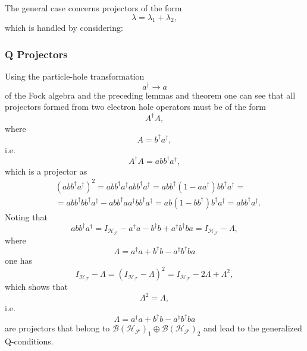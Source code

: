 \documentclass[aps,preprint,amsfonts,amssymb,showpacs,showkeys]{revtex4}%
\begin{document}
The general case concerns projectors of the form
\begin{equation}
\lambda=\lambda_{1}+\lambda_{2},
\end{equation}
which is handled by considering:

\subsubsection{Q Projectors}

Using the particle-hole transformation
\begin{equation}
a^{\dagger}\rightarrow a
\end{equation}
of the Fock algebra and the preceding lemmas and theorem one can see that all
projectors formed from two electron hole operators must be of the form%
\begin{equation}
A^{\dagger}A,
\end{equation}
where
\begin{equation}
A=b^{\dagger}a^{\dagger},
\end{equation}
i.e.%
\begin{equation}
A^{\dagger}A=abb^{\dagger}a^{\dagger},
\end{equation}
which is a projector as
\begin{align}
&  \left(  abb^{\dagger}a^{\dagger}\right)  ^{2}=abb^{\dagger}a^{\dagger
}abb^{\dagger}a^{\dagger}=abb^{\dagger}\left(  1-aa^{\dagger}\right)
bb^{\dagger}a^{\dagger}=\nonumber\\
&  =abb^{\dagger}bb^{\dagger}a^{\dagger}-abb^{\dagger}aa^{\dagger}bb^{\dagger
}a^{\dagger}=ab\left(  1-bb^{\dagger}\right)  b^{\dagger}a^{\dagger
}=abb^{\dagger}a^{\dagger}.
\end{align}
Noting that
\begin{equation}
abb^{\dagger}a^{\dagger}=I_{\mathcal{H}_{\mathcal{F}}}-a^{\dagger}%
a-b^{\dagger}b+a^{\dagger}b^{\dagger}ba=I_{\mathcal{H}_{\mathcal{F}}}-\Lambda,
\end{equation}
where
\begin{equation}
\Lambda=a^{\dagger}a+b^{\dagger}b-a^{\dagger}b^{\dagger}ba
\end{equation}
one has
\begin{equation}
I_{\mathcal{H}_{\mathcal{F}}}-\Lambda=\left(  I_{\mathcal{H}_{\mathcal{F}}%
}-\Lambda\right)  ^{2}=I_{\mathcal{H}_{\mathcal{F}}}-2\Lambda+\Lambda^{2},
\end{equation}
which shows that
\begin{equation}
\Lambda^{2}=\Lambda,
\end{equation}
i.e.
\begin{equation}
\Lambda=a^{\dagger}a+b^{\dagger}b-a^{\dagger}b^{\dagger}ba
\end{equation}
are projectors that belong to $\mathcal{B}\left(  \mathcal{H}_{\mathcal{F}%
}\right)  _{1}\oplus\mathcal{B}\left(  \mathcal{H}_{\mathcal{F}}\right)  _{2}$
and lead to the generalized Q-conditions.
\end{document}
